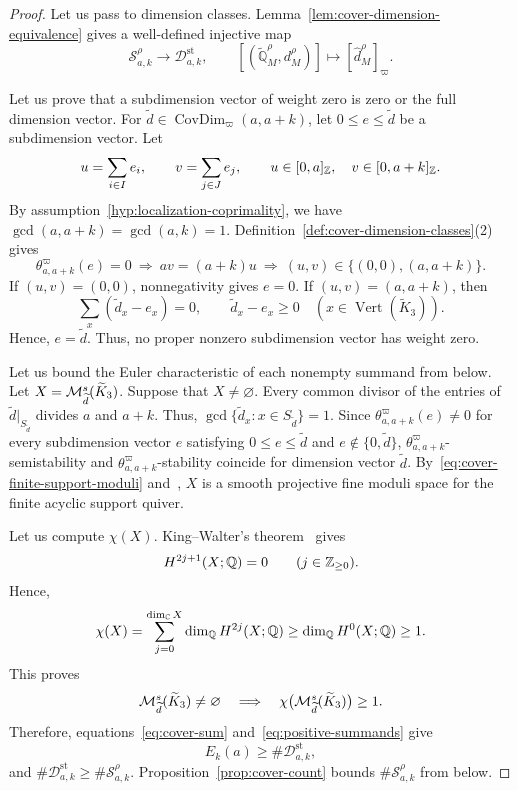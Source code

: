 \begin{proof}
Let us pass to dimension classes.
Lemma~\ref{lem:cover-dimension-equivalence} gives a well-defined injective map
\[
 \mathcal S_{a,k}^\rho\longrightarrow\mathcal D^{\mathrm{st}}_{a,k},\qquad
 [(\widetilde{\mathbb Q}_M^\rho,d_M^\rho)]\longmapsto[\widehat d_M^\rho]_{\varpi}.
\]

Let us prove that a subdimension vector of weight zero is zero or the full dimension vector.
For $\widetilde d\in\operatorname{CovDim}_{\varpi}(a,a+k)$, let $0\le e\le\widetilde d$ be a subdimension vector.
Let
\[
 u=\sum_{i\in I}e_i,\qquad v=\sum_{j\in J}e_j,
 \qquad u\in[0,a]_{\mathbb Z},\quad v\in[0,a+k]_{\mathbb Z}.
\]
By assumption~\ref{hyp:localization-coprimality}, we have $\gcd(a,a+k)=\gcd(a,k)=1$.
Definition~\ref{def:cover-dimension-classes}(2) gives
\[
 \theta^{\varpi}_{a,a+k}(e)=0
 \ \Longrightarrow\ av=(a+k)u
 \ \Longrightarrow\ (u,v)\in\{(0,0),(a,a+k)\}.
\]
If $(u,v)=(0,0)$, nonnegativity gives $e=0$.
If $(u,v)=(a,a+k)$, then
\[
 \sum_x(\widetilde d_x-e_x)=0,
 \qquad \widetilde d_x-e_x\ge0\quad(x\in\operatorname{Vert}(\widetilde K_3)).
\]
Hence, $e=\widetilde d$.
Thus, no proper nonzero subdimension vector has weight zero.

Let us bound the Euler characteristic of each nonempty summand from below.
Let $X=\mathcal M^s_{\widetilde d}(\widetilde K_3)$.
Suppose that $X\ne\varnothing$.
Every common divisor of the entries of $\widetilde d|_{S_{\widetilde d}}$ divides $a$ and $a+k$.
Thus, $\gcd\{\widetilde d_x:x\in S_{\widetilde d}\}=1$.
Since $\theta^{\varpi}_{a,a+k}(e)\ne0$ for every subdimension vector $e$ satisfying $0\le e\le\widetilde d$ and $e\notin\{0,\widetilde d\}$, $\theta^{\varpi}_{a,a+k}$-semistability and $\theta^{\varpi}_{a,a+k}$-stability coincide for dimension vector $\widetilde d$.
By~\eqref{eq:cover-finite-support-moduli} and~\cite[Propositions 4.3 and 5.3, Remark 5.4]{King},
$X$ is a smooth projective fine moduli space for the finite acyclic support quiver.

Let us compute $\chi(X)$.
King--Walter's theorem~\cite[Theorem 3(c)]{KingWalter} gives
\[
 H^{2j+1}(X;\mathbb Q)=0\qquad(j\in\mathbb Z_{\ge0}).
\]
Hence,
\[
 \chi(X)=\sum_{j=0}^{\dim_{\mathbb C}X}\dim_{\mathbb Q}H^{2j}(X;\mathbb Q)
 \ge\dim_{\mathbb Q}H^0(X;\mathbb Q)\ge1.
\]
This proves
\begin{equation}
 \mathcal M^s_{\widetilde d}(\widetilde K_3)\ne\varnothing
 \quad\Longrightarrow\quad
 \chi\bigl(\mathcal M^s_{\widetilde d}(\widetilde K_3)\bigr)\ge1.
\label{eq:positive-summands}
\end{equation}
Therefore, equations~\eqref{eq:cover-sum} and~\eqref{eq:positive-summands} give
\[
 E_k(a)\ge
 \#\mathcal D^{\mathrm{st}}_{a,k},
\]
and $\#\mathcal D^{\mathrm{st}}_{a,k}\ge\#\mathcal S_{a,k}^\rho$. Proposition~\ref{prop:cover-count} bounds $\#\mathcal S_{a,k}^\rho$ from below.
\end{proof}

